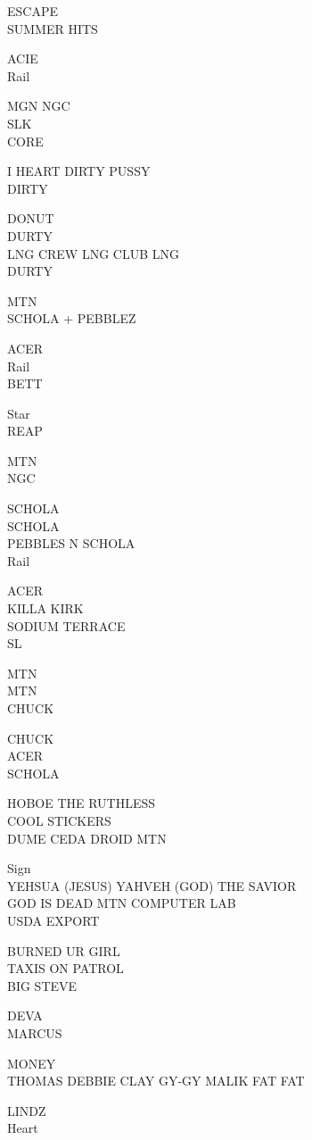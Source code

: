 \documentclass[10pt,letterpaper]{article}
\begin{document}
ESCAPE\\
SUMMER HITS

ACIE\\
Rail

MGN NGC\\
SLK\\
CORE

I HEART DIRTY PUSSY\\
DIRTY

DONUT\\
DURTY\\
LNG CREW LNG CLUB LNG\\
DURTY

MTN\\
SCHOLA + PEBBLEZ

ACER\\
Rail\\
BETT

Star\\
REAP

MTN\\
NGC

SCHOLA\\
SCHOLA\\
PEBBLES N SCHOLA\\
Rail

ACER\\
KILLA KIRK\\
SODIUM TERRACE\\
SL

MTN\\
MTN\\
CHUCK

CHUCK\\
ACER\\
SCHOLA

HOBOE THE RUTHLESS\\
COOL STICKERS\\
DUME CEDA DROID MTN

Sign\\
YEHSUA (JESUS) YAHVEH (GOD) THE SAVIOR\\
GOD IS DEAD MTN COMPUTER LAB\\
USDA EXPORT

BURNED UR GIRL\\
TAXIS ON PATROL\\
BIG STEVE

DEVA\\
MARCUS

MONEY\\
THOMAS DEBBIE CLAY GY{-}GY MALIK FAT FAT

LINDZ\\
Heart
\end{document}
